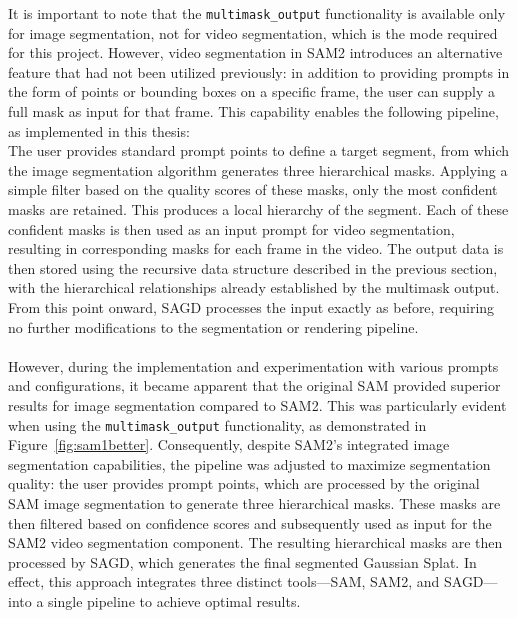 \documentclass[12pt]{article}
\begin{document}
\FloatBarrier
\noindent
It is important to note that the \texttt{multimask\_output} functionality is available only for image segmentation, not for video segmentation, which is the mode required for this project. However, video segmentation in SAM2 introduces an alternative feature that had not been utilized previously: in addition to providing prompts in the form of points or bounding boxes on a specific frame, the user can supply a full mask as input for that frame. This capability enables the following pipeline, as implemented in this thesis:
\\
The user provides standard prompt points to define a target segment, from which the image segmentation algorithm generates three hierarchical masks. Applying a simple filter based on the quality scores of these masks, only the most confident masks are retained. This produces a local hierarchy of the segment. Each of these confident masks is then used as an input prompt for video segmentation, resulting in corresponding masks for each frame in the video. The output data is then stored using the recursive data structure described in the previous section, with the hierarchical relationships already established by the multimask output. From this point onward, SAGD processes the input exactly as before, requiring no further modifications to the segmentation or rendering pipeline.
\\\\
However, during the implementation and experimentation with various \linebreak prompts and configurations, it became apparent that the original SAM provided superior results for image segmentation compared to SAM2. This was particularly evident when using the \texttt{multimask\_output} functionality, as demonstrated in Figure~\ref{fig:sam1better}. Consequently, despite SAM2’s integrated image segmentation capabilities, the pipeline was adjusted to maximize segmentation quality: the user provides prompt points, which are processed by the original SAM image segmentation to generate three hierarchical masks. These masks are then filtered based on confidence scores and subsequently used as input for the SAM2 video segmentation component. The resulting hierarchical masks are then processed by SAGD, which generates the final segmented Gaussian Splat. In effect, this approach integrates three distinct tools—SAM, SAM2, and SAGD—into a single pipeline to achieve optimal results.
\end{document}
